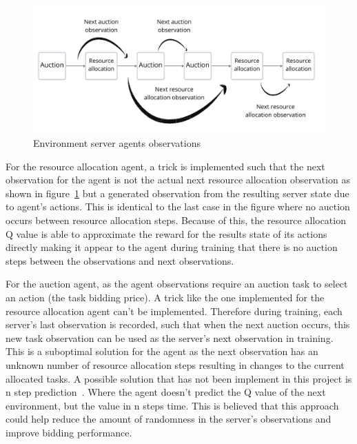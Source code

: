 \begin{figure}
    \centering
    \includegraphics[width=14cm]{figures/3_implementation_figs/env_server_agents_observations.pdf}
    \caption{Environment server agents observations}
    \label{fig:environment-observations}
\end{figure}

For the resource allocation agent, a trick is implemented such that the next observation for the agent is not the
actual next resource allocation observation as shown in figure~\ref{fig:environment-observations} but a generated
observation from the resulting server state due to agent's actions. This is identical to the last case in the figure
where no auction occurs between resource allocation steps. Because of this, the resource allocation Q value is able to
approximate the reward for the results state of its actions directly making it appear to the agent during training that
there is no auction steps between the observations and next observations.

For the auction agent, as the agent observations require an auction task to select an action (the task bidding price).
A trick like the one implemented for the resource allocation agent can't be implemented. Therefore during training,
each server's last observation is recorded, such that when the next auction occurs, this new task observation can be
used as the server's next observation in training. This is a suboptimal solution for the agent as the next observation
has an unknown number of resource allocation steps resulting in changes to the current allocated tasks.
A possible solution that has not been implement in this project is n step prediction~\citep{multi-step-dqn}. Where the
agent doesn't predict the Q value of the next environment, but the value in n steps time. This is believed that this
approach could help reduce the amount of randomness in the server's observations and improve bidding performance.

